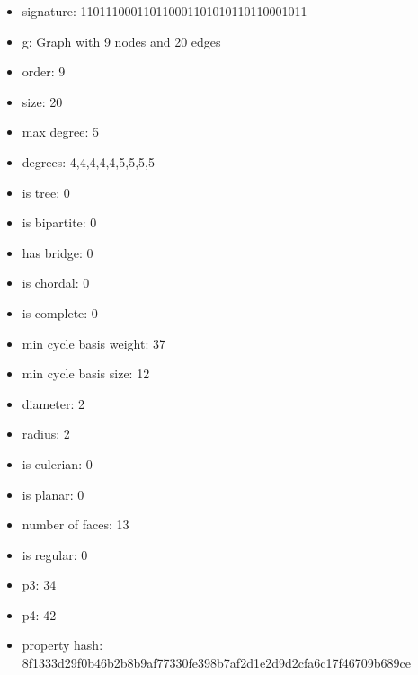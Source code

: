\newpage
\begin{figure}
\end{figure}
\begin{itemize}
\item signature: 110111000110110001101010110110001011
\item g: Graph with 9 nodes and 20 edges
\item order: 9
\item size: 20
\item max degree: 5
\item degrees: 4,4,4,4,4,5,5,5,5
\item is tree: 0
\item is bipartite: 0
\item has bridge: 0
\item is chordal: 0
\item is complete: 0
\item min cycle basis weight: 37
\item min cycle basis size: 12
\item diameter: 2
\item radius: 2
\item is eulerian: 0
\item is planar: 0
\item number of faces: 13
\item is regular: 0
\item p3: 34
\item p4: 42
\item property hash: 8f1333d29f0b46b2b8b9af77330fe398b7af2d1e2d9d2cfa6c17f46709b689ce
\end{itemize}
